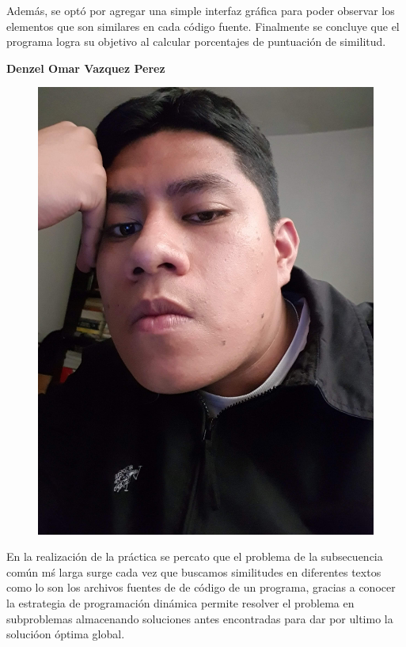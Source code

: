 \documentclass[12pt,twoside]{article}
\begin{document}
    Además, se optó por agregar una simple interfaz gráfica para poder observar los elementos que son similares en cada código fuente. Finalmente se concluye que el programa logra su objetivo al calcular porcentajes de puntuación de similitud.
    
    
    \textbf{\large Denzel Omar Vazquez Perez}
        \begin{figure}[H]
            \centering
            \includegraphics[angle=-90, scale= 0.05]{imagenes/foto2.jpg}
        \end{figure}
    En la realizaci\'on de la pr\'actica se percato que el problema de la subsecuencia com\'un m\'s larga surge cada vez que buscamos similitudes en diferentes textos como lo son los archivos fuentes de de c\'odigo de un programa, gracias a conocer la estrategia de programaci\'on dinámica permite resolver el problema en subproblemas almacenando soluciones antes encontradas para dar por ultimo la soluci\'oon \'optima global.\\
    
\end{document}
